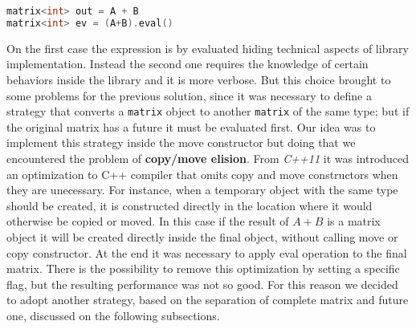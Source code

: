 \documentclass[10pt,a4paper]{article}
\begin{document}
\begin{lstlisting}[language=C++]
matrix<int> out = A + B
matrix<int> ev = (A+B).eval()
\end{lstlisting}
On the first case the expression is by evaluated hiding technical aspects of library implementation. Instead the second one requires the knowledge of certain behaviors inside the library and it is more verbose. But this choice brought to some problems for the previous solution, since it was necessary to define a strategy that converts a \verb|matrix| object to another \verb|matrix| of the same type; but if the original matrix has a future it must be evaluated first. Our idea was to implement this strategy inside the move constructor but doing that we encountered the problem of \textbf{copy/move elision}. From \textit{C++11} it was introduced an optimization to C++ compiler that omits copy and move constructors when they are unecessary. For instance, when a temporary object with the same type should be created, it is constructed directly in the location where it would otherwise be copied or moved. In this case if the result of $A+B$ is a matrix object it will be created directly inside the final object, without calling move or copy constructor. At the end it was necessary to apply eval operation to the final matrix. There is the possibility to remove this optimization by setting a specific flag, but the resulting performance was not so good. For this reason we decided to adopt another strategy, based on the separation of complete matrix and future one, discussed on the following subsections.
\end{document}
